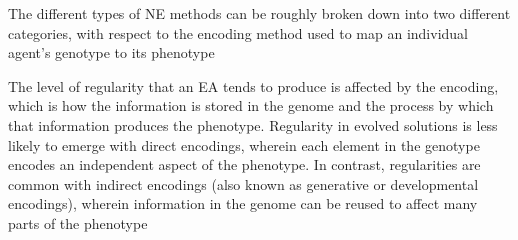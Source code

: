 



The different types of NE methods can be roughly broken down into two different categories, with respect to the encoding method used to map an individual agent's genotype to its phenotype %


The level of regularity that an EA tends to produce is affected by the encoding, which is how the information is stored in the genome and the process by which that information produces the phenotype. 
Regularity in evolved solutions is less likely to emerge with direct encodings, wherein each element in the genotype encodes an independent aspect of the phenotype.
In contrast, regularities are common with indirect encodings (also known as generative or developmental encodings), wherein information in the genome can be reused to affect many parts of the phenotype


